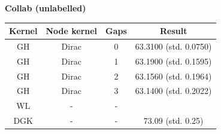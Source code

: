 \documentclass{article}
\begin{document}
\textbf{Collab (unlabelled)}\\
\begin{minipage}{0.6\linewidth}
	\hspace*{-1in}

	\label{fig:collab_unlabelled}
\end{minipage}
\begin{minipage}[c]{0.5\linewidth}
	
	\centering
	\begin{tabular}{c|c|c|c}
		Kernel & Node kernel & Gaps & Result\\
		\hline
		GH & Dirac & 0 & 63.3100 (std. 0.0750) \\
		GH & Dirac & 1 & 63.1900 (std. 0.1595) \\
		GH & Dirac & 2 & 63.1560 (std. 0.1964) \\
		GH & Dirac & 3 & 63.1400 (std. 0.2022) \\
		WL & - & - & \\
		DGK & - & - & 73.09 (std. 0.25)
	\end{tabular}
	\label{table:collab_unlabelled}
\end{minipage}
\end{document}
